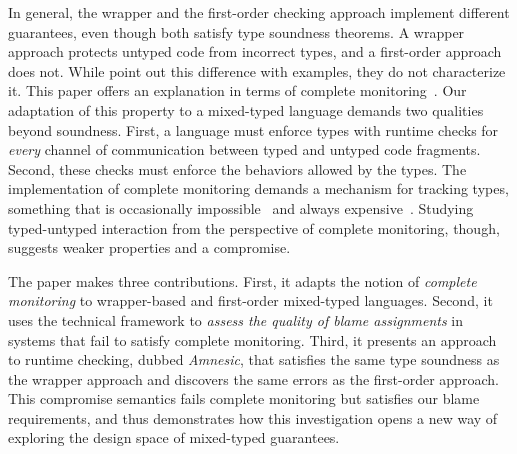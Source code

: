 In general, the wrapper and the first-order checking approach implement
different guarantees, even though both satisfy type soundness
theorems.
A wrapper approach protects untyped code from incorrect types, and a
first-order approach does not.
While  point out this difference with examples,
they do not characterize it.
This paper offers an explanation in terms of complete
monitoring~\cite{dtf-esop-2012}.
Our adaptation of this property to a
mixed-typed language demands two qualities beyond soundness.  First, a
language must enforce types with runtime checks for {\em
every\/} channel of communication between typed and untyped code fragments.
Second, these checks must enforce the behaviors allowed by the types.
The implementation of complete monitoring
demands a mechanism for tracking types, something that is occasionally
impossible~\cite{vss-popl-2017} and always expensive~\cite{aft-dls-2013,
tfdfftf-ecoop-2015, gt-dead-ben}.  Studying typed-untyped interaction from the
perspective of complete monitoring, though, suggests weaker properties and a compromise.

The paper makes three contributions.
First, it adapts the notion of {\em complete monitoring\/} to wrapper-based
 and first-order mixed-typed languages.
Second, it uses the technical framework to {\em assess the quality of blame
assignments\/} in systems that fail to satisfy complete monitoring.
Third, it presents an approach to runtime checking,
dubbed \emph{Amnesic}, that satisfies the same type soundness as
the wrapper approach and discovers the same errors as the first-order approach.
This compromise semantics fails complete monitoring but satisfies our blame
requirements, and thus demonstrates how this investigation opens a new way of
exploring the design space of mixed-typed guarantees.
